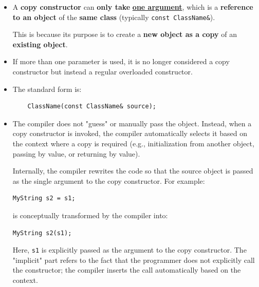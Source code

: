 \documentclass[10pt]{article}
\begin{document}
\begin{itemize}
	\item A \textbf{copy constructor} can \textbf{only take} \textbf{\underline{one argument}}, which is a \textbf{reference to an object} of the \textbf{same class} (typically \verb|const ClassName&|). 

		This is because its purpose is to create a \textbf{new object as a copy} of an \textbf{existing object}.

    \item If more than one parameter is used, it is no longer considered a copy constructor but instead a regular overloaded constructor.

    \item The standard form is:
    \begin{verbatim}
    ClassName(const ClassName& source);
    \end{verbatim}


\item The compiler does not "guess" or manually pass the object. Instead, when a copy constructor is invoked, the compiler automatically selects it based on the context where a copy is required (e.g., initialization from another object, passing by value, or returning by value).

Internally, the compiler rewrites the code so that the source object is passed as the single argument to the copy constructor. For example:

\begin{verbatim}
MyString s2 = s1;
\end{verbatim}

is conceptually transformed by the compiler into:

\begin{verbatim}
MyString s2(s1);
\end{verbatim}

Here, \verb|s1| is explicitly passed as the argument to the copy constructor. The "implicit" part refers to the fact that the programmer does not explicitly call the constructor; the compiler inserts the call automatically based on the context.

\end{itemize}

\newpage
\end{document}
